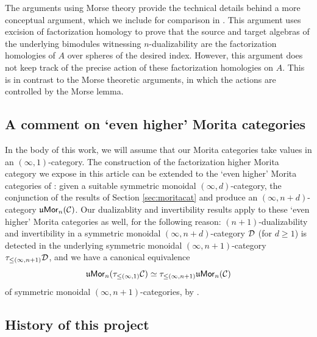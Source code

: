 \documentclass[10pt, reqno, twoside
, final
]{amsart}
\numberwithin{equation}{subsection}%
\theoremstyle{definition}
\theoremstyle{definition}
\theoremstyle{definition}
\theoremstyle{definition}
\theoremstyle{definition}
\theoremstyle{definition}
\theoremstyle{definition}
\theoremstyle{definition}
\theoremstyle{definition}
\theoremstyle{plain}
\theoremstyle{definition}
\theoremstyle{plain}
\theoremstyle{definition}
\theoremstyle{plain}
\theoremstyle{definition}
\theoremstyle{definition}
\theoremstyle{plain}
\theoremstyle{plain}
\theoremstyle{definition}
\theoremstyle{plain}
\theoremstyle{plain}
\theoremstyle{plain}
\begin{document}
The arguments using Morse theory provide the technical details behind a more conceptual argument, which we include for comparison in . This argument uses excision of factorization homology to prove that the source and target algebras of the underlying bimodules witnessing $n$-dualizability are the factorization homologies of $A$ over spheres of the desired index. However, this argument does not keep track of the precise action of these factorization homologies on $A$. This is in contrast to the Morse theoretic arguments, in which the actions are controlled by the Morse lemma.



\subsection{A comment on `even higher' Morita categories}\label{sec:evenhigher}

In the body of this work, we will assume that our Morita categories take values in an $(\infty,1)$-category. The construction of the factorization higher Morita category we expose in this article can be extended to the `even higher' Morita categories of \cite{JFS}: given a suitable symmetric monoidal $(\infty,d)$-category, the conjunction of the results of Section \ref{sec:moritacat} and \cite[Section 8]{JFS} produce an $(\infty,n+d)$-category $\mathfrak{u}\mathsf{Mor}_n(\mathcal{C})$. Our dualizablity and invertibility results apply to these `even higher' Morita categories as well, for the following reason: $(n+1)$-dualizability and invertibility in a symmetric monoidal $(\infty,n+d)$-category $\mathcal{D}$ (for $d\geq 1$) is detected in the underlying symmetric monoidal $(\infty,n+1)$-category $\tau_{\leq (\infty,n+1)}\mathcal{D}$, and we have a canonical equivalence 
\[  \mathfrak{u}\mathsf{Mor}_n(\tau_{\leq (\infty,1)}\mathcal{C}) \simeq \tau_{\leq (\infty,n+1)}\mathfrak{u}\mathsf{Mor}_n(\mathcal{C}) \]
of symmetric monoidal $(\infty,n+1)$-categories, by \cite[Proposition A.20]{GS}.

\subsection{History of this project}
\end{document}
